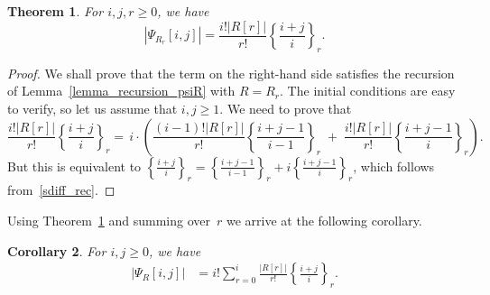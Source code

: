 \documentclass[a4paper,11pt,UKenglish]{article}
\newcommand{\stirl}[3]{\genfrac{\{}{\}}{0pt}{}{{#1}}{{#2}}_{{#3}}}
\newcommand{\sdiff}[3]{\genfrac{\{}{\}}{}{}{{#1}}{{#2}}_{{#3}}}
\newtheorem{theorem}{Theorem}[section]
\newtheorem{corollary}[theorem]{Corollary}
\theoremstyle{definition}
\begin{document}
\begin{theorem}\label{thm_PsiRr}
For $i,j,r\ge 0$, we have
\begin{equation*}%
|\Psi_{R_r}[i,j]|=\frac{i!|R[r]|}{r!}\sdiff{i+j}{i}{r}.
\end{equation*}
\end{theorem}
\begin{proof}
We shall prove that the term
on the right-hand side satisfies the recursion of
Lemma~\ref{lemma_recursion_psiR} with $R=R_r$.
The initial conditions are easy to verify, so let us assume that $i,j\ge 1$.
We need to prove that
\[
\frac{i!|R[r]|}{r!}\sdiff{i+j}{i}{r} =\,
i\cdot\left(
\frac{(i-1)!|R[r]|}{r!}\sdiff{i+j-1}{i-1}{r}
\;+\;\frac{i!|R[r]|}{r!}\sdiff{i+j-1}{i}{r}
\right).
\]
But this is equivalent to
$\sdiff{i+j}{i}{r} = \sdiff{i+j-1}{i-1}{r}+i\sdiff{i+j-1}{i}{r}$,
which follows from~\eqref{sdiff_rec}.
\end{proof}

Using Theorem~\ref{thm_PsiRr} and summing over~$r$ we arrive at the
following corollary.

\begin{corollary}
  For $i,j\ge 0$, we have
  \begin{align}
    |\Psi_R[i,j]|
    &= i!\sum_{r=0}^i\frac{|R[r]|}{r!}\sdiff{i+j}{i}{r}.\label{formula_psiR}
  \end{align}
\end{corollary}
\end{document}
